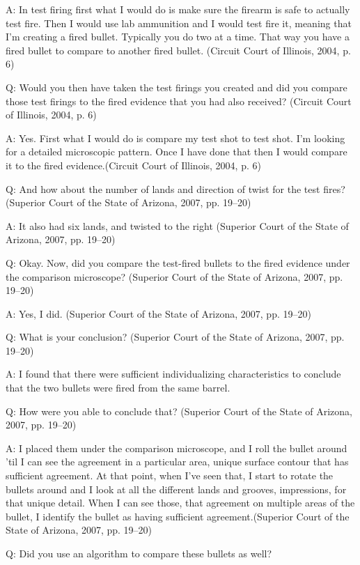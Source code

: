 \documentclass[print]{nuthesis}
\begin{document}
A: In test firing first what I would do is make sure the firearm is safe to actually test fire.
Then I would use lab ammunition and I would test fire it, meaning that I'm creating a fired bullet.
Typically you do two at a time.
That way you have a fired bullet to compare to another fired bullet. (Circuit Court of Illinois, 2004, p. 6)

Q: Would you then have taken the test firings you created and did you compare those test firings to the fired evidence that you had also received? (Circuit Court of Illinois, 2004, p. 6)

A: Yes. First what I would do is compare my test shot to test shot.
I'm looking for a detailed microscopic pattern.
Once I have done that then I would compare it to the fired evidence.(Circuit Court of Illinois, 2004, p. 6)

Q: And how about the number of lands and direction of twist for the test fires? (Superior Court of the State of Arizona, 2007, pp. 19--20)

A: It also had six lands, and twisted to the right (Superior Court of the State of Arizona, 2007, pp. 19--20)

Q: Okay. Now, did you compare the test-fired bullets to the fired evidence under the comparison microscope? (Superior Court of the State of Arizona, 2007, pp. 19--20)

A: Yes, I did. (Superior Court of the State of Arizona, 2007, pp. 19--20)

Q: What is your conclusion? (Superior Court of the State of Arizona, 2007, pp. 19--20)

A: I found that there were sufficient individualizing characteristics to conclude that the two bullets were fired from the same barrel.

Q: How were you able to conclude that? (Superior Court of the State of Arizona, 2007, pp. 19--20)

A: I placed them under the comparison microscope, and I roll the bullet around 'til I can see the agreement in a particular area, unique surface contour that has sufficient agreement.
At that point, when I've seen that, I start to rotate the bullets around and I look at all the different lands and grooves, impressions, for that unique detail.
When I can see those, that agreement on multiple areas of the bullet, I identify the bullet as having sufficient agreement.(Superior Court of the State of Arizona, 2007, pp. 19--20)

Q: Did you use an algorithm to compare these bullets as well?
\end{document}
